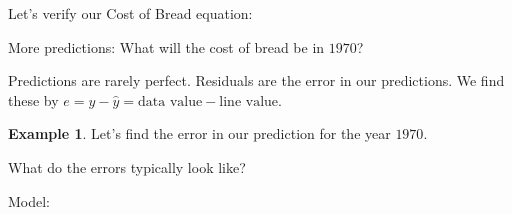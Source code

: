 \documentclass[12pt]{amsart}
\theoremstyle{definition}
\newtheorem{ex}{Example}
\begin{document}
\vfill
\noindent Let's verify our Cost of Bread equation:

\vfill
\noindent More predictions: What will the cost of bread be in $1970$?

\vfill
\noindent
Predictions are rarely perfect. Residuals are the error in our predictions. We find these by $e=y-\hat{y}=\text{data value}-\text{line value}.$\\
\begin{ex}Let's find the error in our prediction for the year $1970$.\end{ex}

\vfill
\noindent What do the errors typically look like?

\vfill
Model: 

\vfill
 
\end{document}
